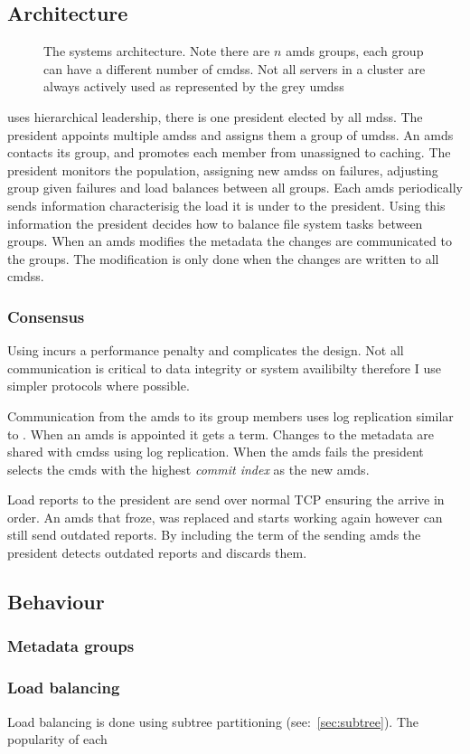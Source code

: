 \subsection{Architecture}
\begin{figure}
	
	\caption{The systems architecture. Note there are $n$ \acf{amds} groups, each group can have a different number of \acfp{cmds}. Not all servers in a cluster are always actively used as represented by the grey \acfp{umds}}
\end{figure}

\Name{} uses hierarchical leadership, there is one president elected by all \acp{mds}. The president appoints multiple \acfp{amds} and assigns them a group of \acfp{umds}. An \ac{amds} contacts its group, and promotes each member from unassigned to caching. The president monitors the population, assigning new \acp{amds} on failures, adjusting group given failures and load balances between all groups. Each \ac{amds} periodically sends information characterisig the load it is under to the president. Using this information the president decides how to balance file system tasks between groups. When an \ac{amds} modifies the metadata the changes are communicated to the groups. The modification is only done when the changes are written to all \acp{cmds}.
%
\subsubsection*{Consensus}
Using \raft{} incurs a performance penalty and complicates the design. Not all communication is critical to data integrity or system availibilty therefore I use simpler protocols where possible. 

Communication from the \ac{amds} to its group members uses log replication similar to \raft{}. When an \ac{amds} is appointed it gets a \raft{} term. Changes to the metadata are shared with \acp{cmds} using log replication. When the \ac{amds} fails the president selects the \ac{cmds} with the highest \textsl{commit index} as the new \ac{amds}.

Load reports to the president are send over normal TCP ensuring the arrive in order. An \ac{amds} that froze, was replaced and starts working again however can still send outdated reports. By including the term of the sending \ac{amds} the president detects outdated reports and discards them.
%
\subsection{Behaviour}

\subsubsection*{Metadata groups}

\subsubsection*{Load balancing}
Load balancing is done using subtree partitioning (see:~\cref{sec:subtree}). The popularity of each 

